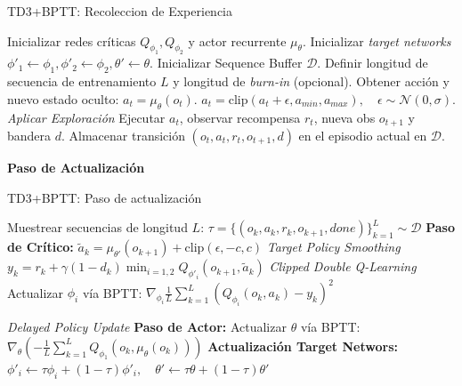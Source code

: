 \begin{frame}{TD3+BPTT: Recoleccion de Experiencia}
    \begin{algorithmic}[1]
        \State Inicializar redes críticas $Q_{\phi_1}, Q_{\phi_2}$ y actor recurrente $\mu_\theta$.
        \State Inicializar \textit{target networks} $\phi'_1 \leftarrow \phi_1, \phi'_2 \leftarrow \phi_2, \theta' \leftarrow \theta$.
        \State Inicializar Sequence Buffer $\mathcal{D}$.
        \State Definir longitud de secuencia de entrenamiento $L$ y longitud de \textit{burn-in} (opcional).
            \State Obtener acción y nuevo estado oculto: $a_t = \mu_\theta(o_t)$.
            \State $a_t = \text{clip}(a_t + \epsilon, a_{min}, a_{max}), \quad \epsilon \sim \mathcal{N}(0, \sigma)$. \hfill \textit{\color{blue} Aplicar Exploración}
            \State Ejecutar $a_t$, observar recompensa $r_t$, nueva obs $o_{t+1}$ y bandera $d$.
            \State Almacenar transición $(o_t, a_t, r_t, o_{t+1}, d)$ en el episodio actual en $\mathcal{D}$.
            
            \State \textbf{Paso de Actualización}
        \EndFor
    \end{algorithmic}
\end{frame}

\begin{frame}{TD3+BPTT: Paso de actualización}
    \begin{algorithmic}[1]
        \State Muestrear secuencias de longitud $L$: $\tau = \{(o_k, a_k, r_k, o_{k+1}, done)\}_{k=1}^L \sim \mathcal{D}$
        \State \textbf{Paso de Crítico:}
        \State \quad $\tilde{a}_{k} = \mu_{\theta'}(o_{k+1}) + \text{clip}(\epsilon, -c, c)$ \hfill \textit{\color{blue}Target Policy Smoothing}
        \State \quad $y_{k} = r_{k} + \gamma(1-d_{k}) \min_{i=1,2} Q_{\phi'_i}(o_{k+1}, \tilde{a}_{k})$ \hfill \textit{\color{blue}Clipped Double Q-Learning}
        \State \quad Actualizar $\phi_i$ vía BPTT: $\nabla_{\phi_i} \frac{1}{L} \sum_{k=1}^L (Q_{\phi_i}(o_k, a_k) - y_k)^2$
        
         \hfill \textit{\color{blue}Delayed Policy Update}
            \State \textbf{Paso de Actor:}
            \State \quad Actualizar $\theta$ vía BPTT: $\nabla_{\theta} \left( - \frac{1}{L} \sum_{k=1}^L Q_{\phi_1}(o_k, \mu_\theta(o_k)) \right)$
            \State \textbf{Actualización Target Networs:}
            \State \quad $\phi'_i \leftarrow \tau \phi_i + (1-\tau)\phi'_i, \quad \theta' \leftarrow \tau \theta + (1-\tau)\theta'$
        \EndIf
    \end{algorithmic}
\end{frame}

